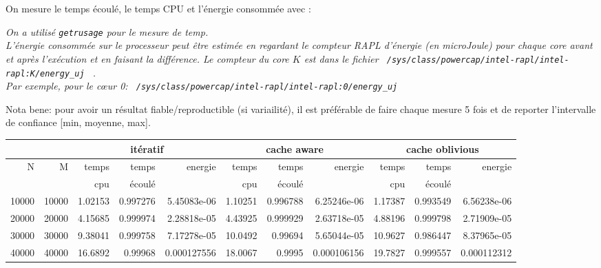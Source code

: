 \documentclass[10pt,a4paper]{article}
\begin{document}
On mesure le temps écoulé, le temps CPU et l'énergie consommée avec : {\em  On a utilisé {\tt getrusage} pour le mesure de temp.
\\
L'énergie consommée sur le processeur peut être estimée en regardant le compteur RAPL d'énergie (en microJoule)
pour chaque core avant et après l'exécution et en faisant la différence.
Le compteur du core $K$ est dans le fichier 
\verb+ /sys/class/powercap/intel-rapl/intel-rapl:K/energy_uj + .\\
Par exemple, pour le c{\oe}ur 0: 
\verb+ /sys/class/powercap/intel-rapl/intel-rapl:0/energy_uj +

Nota bene: pour avoir un résultat fiable/reproductible (si variailité), 
il est préférable de faire chaque mesure 5 fois et de reporter l'intervalle
de confiance [min, moyenne, max]. 

\begin{tabular}{|r|r||r|r|r||r|r|r||r|r|r||}
\hline
 \multicolumn{2}{|c||}{ } 
& \multicolumn{3}{c||}{itératif}
& \multicolumn{3}{c||}{cache aware}
& \multicolumn{3}{c||}{cache oblivious}
\\ \hline
N & M 
& temps   & temps & energie       %
& temps   & temps & energie       %
& temps   & temps & energie       %
\\
& 
& cpu     & écoulé&               %
& cpu     & écoulé&               %
& cpu     & écoulé&               %
\\ \hline
\hline
10000 & 10000 
& 1.02153 & 0.997276 & 5.45083e-06  %
& 1.10251 & 0.996788 &  6.25246e-06 %
& 1.17387 & 0.993549 &  6.56238e-06 %
\\ \hline
20000 & 20000 
& 4.15685 & 0.999974 &  2.28818e-05 %
& 4.43925 & 0.999929 &  2.63718e-05  %
& 4.88196 & 0.999798 &  2.71909e-05 %
\\ \hline
30000 & 30000 
& 9.38041 & 0.999758 &  7.17278e-05 %
& 10.0492 & 0.99694 &  5.65044e-05 %
& 10.9627 & 0.986447 &  8.37965e-05 %
\\ \hline
40000 & 40000 
& 16.6892 & 0.99968 &  0.000127556 %
& 18.0067 & 0.9995 &  0.000106156 %
& 19.7827 & 0.999557 &  0.000112312 %
\\ \hline
\hline
\end{tabular}
}
\end{document}
